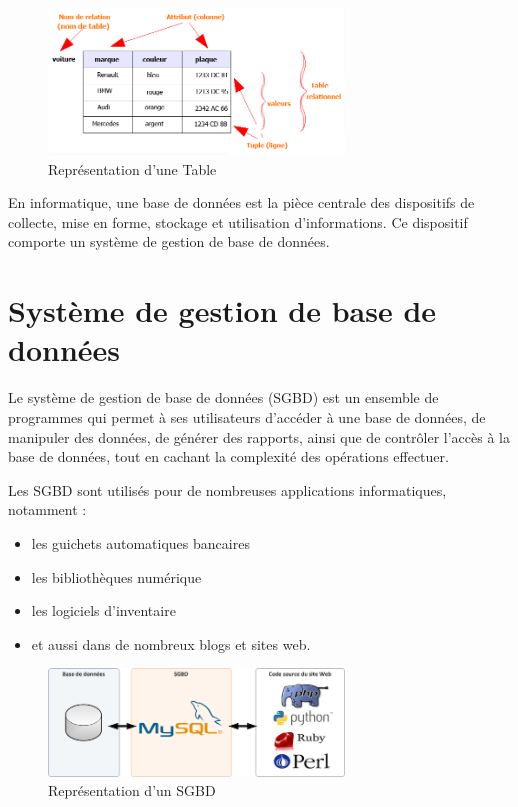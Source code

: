 \documentclass[oneside,13pt,a4paper]{report}
\begin{document}
\begin{figure}[h]
	\centering
	\includegraphics[width=0.7\textwidth]{img/table_relationnel.png}
	\caption{Représentation d'une Table}
\end{figure}

En informatique, une base de données est la pièce centrale des dispositifs de collecte, mise en forme, stockage et utilisation d'informations.
Ce dispositif comporte un système de gestion de base de données.

\section{Système de gestion de base de données}
\label{sgbd}
Le système de gestion de base de données (SGBD) est un ensemble de programmes qui permet à ses utilisateurs d'accéder à une base de données,
de manipuler des données, de générer des rapports, ainsi que de contrôler l'accès à la base de données,
tout en cachant la complexité des opérations effectuer.

Les SGBD sont utilisés pour de nombreuses applications informatiques, notamment :
\begin{itemize}
	\item les guichets automatiques bancaires
	\item les bibliothèques numérique
	\item les logiciels d'inventaire
	\item et aussi dans de nombreux blogs et sites web.
\end{itemize}


\begin{figure}[h]
	\centering
	\includegraphics[width=0.7\textwidth]{img/sgbd.png}
	\caption{Représentation d'un SGBD}
\end{figure}
\end{document}
